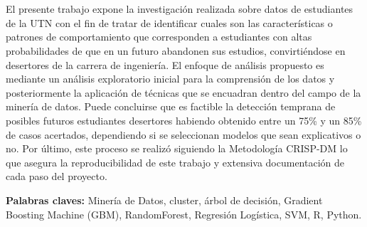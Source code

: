 \chapter*{\runtitulo}

\noindent El presente trabajo expone la investigación realizada sobre datos de estudiantes de la UTN con el fin de tratar de identificar cuales son las características o patrones de comportamiento que corresponden a estudiantes con altas probabilidades de que en un futuro abandonen sus estudios, convirtiéndose en desertores de la carrera de ingeniería. El enfoque de análisis propuesto es mediante un análisis exploratorio inicial para la comprensión de los datos y posteriormente la aplicación de técnicas que se encuadran dentro del campo de la minería de datos. Puede concluirse que es factible la detección temprana de posibles futuros estudiantes desertores habiendo obtenido entre un 75\% y un 85\% de casos acertados, dependiendo si se seleccionan modelos que sean explicativos o no. Por último, este proceso se realizó siguiendo la Metodología CRISP-DM lo que asegura la reproducibilidad de este trabajo y extensiva documentación de cada paso del proyecto.

\bigskip

\noindent\textbf{Palabras claves:} Minería de Datos, cluster, árbol de decisión, Gradient Boosting Machine (GBM), RandomForest, Regresión Logística, SVM, R, Python.



